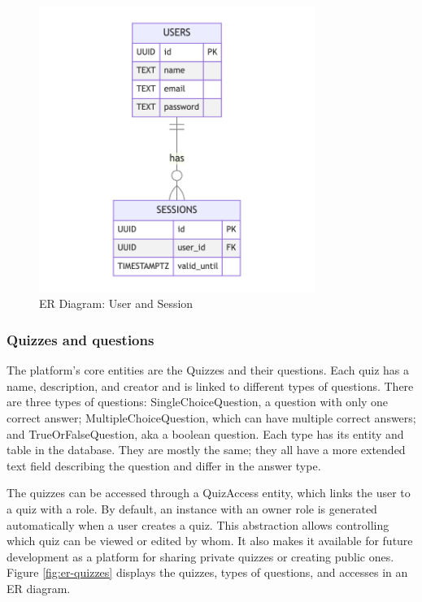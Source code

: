 \begin{figure}[H]
    \centering
    \includegraphics[width=0.8\textwidth, keepaspectratio]{figures/er-user-and-session.png}
    \caption{ER Diagram: User and Session}
    \label{fig:er-user-and-session}
\end{figure}

\subsubsection{Quizzes and questions}

The platform's core entities are the Quizzes and their questions. Each quiz has a name, description, and creator and is linked to different types of questions. There are three types of questions: SingleChoiceQuestion, a question with only one correct answer; MultipleChoiceQuestion, which can have multiple correct answers; and TrueOrFalseQuestion, aka a boolean question. Each type has its entity and table in the database. They are mostly the same; they all have a more extended text field describing the question and differ in the answer type.

The quizzes can be accessed through a QuizAccess entity, which links the user to a quiz with a role. By default, an instance with an owner role is generated automatically when a user creates a quiz. This abstraction allows controlling which quiz can be viewed or edited by whom. It also makes it available for future development as a platform for sharing private quizzes or creating public ones. Figure \ref{fig:er-quizzes} displays the quizzes, types of questions, and accesses in an ER diagram.

